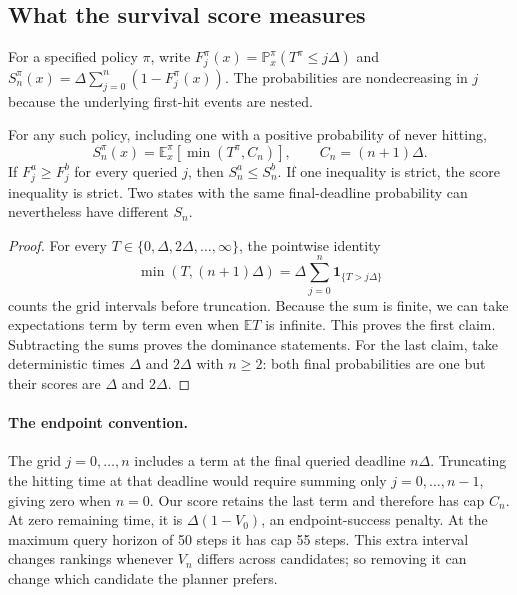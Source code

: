 \documentclass{article} %
\newcommand{\ind}{\mathbf{1}}
\newcommand{\EE}{\mathbb E}
\newcommand{\PP}{\mathbb P}
\theoremstyle{definition}
\theoremstyle{remark}
\begin{document}
\subsection{What the survival score measures}
\label{app:survival}
For a specified policy $\pi$, write
$F_j^\pi(x)=\PP_x^\pi(T^\pi\le j\Delta)$ and
$S_n^\pi(x)=\Delta\sum_{j=0}^{n}(1-F_j^\pi(x))$.
The probabilities are nondecreasing in $j$ because the underlying first-hit events
are nested.

\begin{proposition}
\label{prop:survival}
For any such policy, including one with a positive probability of never hitting,
\begin{equation}
 S_n^\pi(x)=\EE_x^\pi[\min(T^\pi,C_n)],\qquad C_n=(n+1)\Delta.
 \label{eq:tail-identity}
\end{equation}
If $F_j^a\ge F_j^b$ for every queried $j$, then $S_n^a\le S_n^b$.
If one inequality is strict, the score inequality is strict.
Two states with the same final-deadline probability can nevertheless have different
$S_n$.
\end{proposition}
\begin{proof}
For every $T\in\{0,\Delta,2\Delta,\ldots,\infty\}$, the pointwise identity
\[
 \min(T,(n+1)\Delta)=\Delta\sum_{j=0}^{n}\ind_{\{T>j\Delta\}}
\]
counts the grid intervals before truncation. Because the sum is finite, we can take
expectations term by term even when $\EE T$ is infinite. This proves the
first claim. Subtracting the sums proves the dominance statements.
For the last claim, take deterministic times $\Delta$ and $2\Delta$ with $n\ge2$:
both final probabilities are one but their scores are $\Delta$ and $2\Delta$.
\end{proof}

\paragraph{The endpoint convention.}
The grid $j=0,\ldots,n$ includes a term at the final queried deadline $n\Delta$.
Truncating the hitting time at that deadline would require summing only
$j=0,\ldots,n-1$, giving zero when $n=0$.
Our score retains the last term and therefore has cap $C_n$.
At zero remaining time, it is $\Delta(1-V_0)$, an endpoint-success penalty.
At the maximum query horizon of 50 steps it has cap 55 steps.
This extra interval changes rankings whenever $V_n$ differs across candidates;
so removing it can change which candidate the planner prefers.
\end{document}
